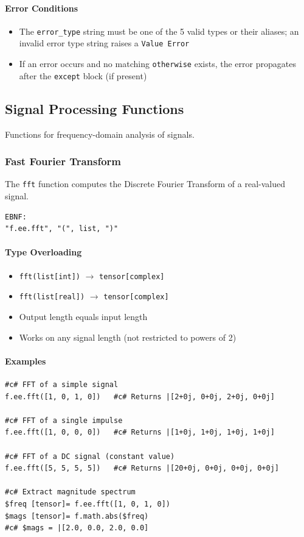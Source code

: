 \paragraph{Error Conditions}
\begin{itemize}
\item The \texttt{error\_type} string must be one of the 5 valid types or their aliases; an invalid error type string raises a \texttt{Value Error}
\item If an error occurs and no matching \texttt{otherwise} exists, the error propagates after the \texttt{except} block (if present)
\end{itemize}

\subsection{Signal Processing Functions}
Functions for frequency-domain analysis of signals.

\subsubsection{Fast Fourier Transform}
The \texttt{fft} function computes the Discrete Fourier Transform of a real-valued signal.
\begin{verbatim}
EBNF:
"f.ee.fft", "(", list, ")"
\end{verbatim}

\paragraph{Type Overloading}
\begin{itemize}
\item \texttt{fft(list[int])} $\rightarrow$ \texttt{tensor[complex]}
\item \texttt{fft(list[real])} $\rightarrow$ \texttt{tensor[complex]}
\item Output length equals input length
\item Works on any signal length (not restricted to powers of 2)
\end{itemize}

\paragraph{Examples}
\begin{verbatim}
#c# FFT of a simple signal
f.ee.fft([1, 0, 1, 0])   #c# Returns |[2+0j, 0+0j, 2+0j, 0+0j]

#c# FFT of a single impulse
f.ee.fft([1, 0, 0, 0])   #c# Returns |[1+0j, 1+0j, 1+0j, 1+0j]

#c# FFT of a DC signal (constant value)
f.ee.fft([5, 5, 5, 5])   #c# Returns |[20+0j, 0+0j, 0+0j, 0+0j]

#c# Extract magnitude spectrum
$freq [tensor]= f.ee.fft([1, 0, 1, 0])
$mags [tensor]= f.math.abs($freq)
#c# $mags = |[2.0, 0.0, 2.0, 0.0]
\end{verbatim}

